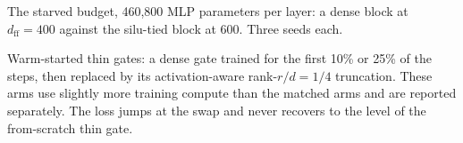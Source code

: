 \documentclass{article}
\begin{document}
\begin{table}[h]
  \centering
  \caption{The starved budget, 460,800 MLP parameters per layer: a dense block at $d_{\mathrm{ff}} = 400$
  against the silu-tied block at 600. Three seeds each.}
  \label{tab:starved}
  \small
  
\end{table}

\begin{table}[h]
  \centering
  \caption{Warm-started thin gates: a dense gate trained for the first 10\% or 25\% of the steps, then
  replaced by its activation-aware rank-$r/d{=}1/4$ truncation. These arms use slightly more training compute
  than the matched arms and are reported separately. The loss jumps at the swap and never recovers to the
  level of the from-scratch thin gate.}
  \label{tab:warm}
  \small
  
\end{table}
\end{document}
